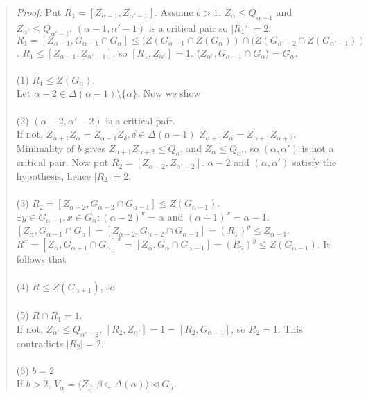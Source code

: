 \begin{quote}
\emph{Proof:}  Put $R_1= [Z_{\alpha - 1}, Z_{\alpha' - 1}]$.  Assume $b > 1$.
$Z_{\alpha} \leq Q_{\alpha+1}$ and $Z_{\alpha'} \leq Q_{\alpha'-1}$.
$(\alpha - 1, \alpha' - 1)$ is a critical pair so $|R_1'| =2$.
$R_1 = [Z_{\alpha - 1}, G_{\alpha - 1} \cap G_{\alpha}] \leq (Z(G_{\alpha - 1} \cap  Z(G_{\alpha})) \cap (Z(G_{\alpha' - 2} \cap  Z(G_{\alpha' - 1}))$.  $R_1 \leq [Z_{\alpha - 1}, Z_{\alpha' - 1}]$, so $[R_1, Z_{\alpha'}] = 1$.
$\langle Z_{\alpha'} , G_{\alpha - 1} \cap G_{\alpha} \rangle = G_{\alpha}$.
\\
\\
(1) $R_1 \leq Z(G_{\alpha})$.
\\
Let $\alpha - 2 \in \Delta(\alpha - 1) \setminus \{ \alpha \}$.  Now we show \\
\\
(2) $(\alpha - 2, \alpha' - 2)$ is a critical pair.\\
If not, $Z_{\alpha + 1} Z_{\alpha} = Z_{\alpha - 1} Z_{\delta}, \delta \in \Delta(\alpha - 1)$
$Z_{\alpha + 1} Z_{\alpha} = Z_{\alpha + 1} Z_{\alpha + 2}$.  Minimality of $b$ gives
$Z_{\alpha + 1} Z_{\alpha + 2} \leq Q_{\alpha'}$ and $Z_{\alpha} \leq Q_{\alpha'}$, so $(\alpha, \alpha')$ is not a critical pair.
Now put $R_2= [Z_{\alpha - 2}, Z_{\alpha' - 2}]$.  $\alpha - 2$ and $(\alpha, \alpha')$ satisfy the hypothesis,
hence $|R_2| = 2$.\\
\\
(3) $R_2 = [Z_{\alpha - 2},  G_{\alpha - 2} \cap G_{\alpha - 1}] \leq Z(G_{\alpha - 1})$.\\
$\exists y \in G_{\alpha - 1}, x \in G_{\alpha} : (\alpha - 2)^y = \alpha$ and $(\alpha + 1)^x = \alpha - 1$.
$[Z_{\alpha}, G_{\alpha - 1} \cap G_{\alpha}] = [Z_{\alpha - 2}, G_{\alpha - 2} \cap G_{\alpha - 1}] = (R_1)^y \leq Z_{\alpha - 1}$.
$R^x = [Z_{\alpha}, G_{\alpha + 1} \cap G_{\alpha}]^x = [Z_{\alpha}, G_{\alpha} \cap G_{\alpha - 1}] = (R_2)^y \leq Z(G_{\alpha - 1})$.
It follows that\\
\\
(4) $ R \leq Z(G_{\alpha + 1})$, so \\
\\
(5) $ R \cap R_1 =1$.\\
If not, $Z_{\alpha'} \leq Q_{\alpha' - 2}$, $[R_2, Z_{\alpha'}] = 1= [R_2, G_{\alpha - 1}]$, so $R_2 =1$.
This contradicts $|R_2|=2$.\\
\\
(6) $b = 2$\\
If $b>2$, $V_{\alpha} = \langle Z_{\beta}, \beta \in \Delta(\alpha) \rangle \lhd G_{\alpha}$.

\end{quote}
